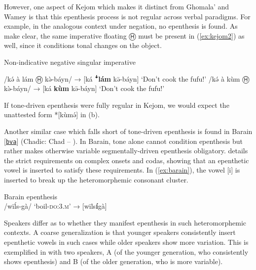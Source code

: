 \documentclass[output=paper,colorlinks,citecolor=brown,draft,draftmode]{langscibook}
\begin{document}
However, one aspect of Kejom which makes it distinct from Ghomala' and Wamey is that this epenthesis process is not regular across verbal paradigms.
For example, in the analogous context under negation, no epenthesis is found.
As \citet{akumbu_segmental_2020} make clear, the same imperative floating  Ⓗ 
must be present in (\ref{ex:kejom2}) as well,
since it conditions tonal changes on the object.

\begin{exe}
	\ex Non-indicative negative singular imperative  \citep[14]{akumbu_segmental_2020} \label{ex:kejom2}
	    \begin{xlist}
	        \ex 	/kə́ à lám Ⓗ kə̀-báyn/	→	[ká \textbf{ꜜlám} kə̄-báyn]		‘Don’t cook the fufu!’
	        \ex /kə́ à kùm Ⓗ kə̀-báyn/	→	[ká \textbf{kùm} kə̄-báyn]			‘Don’t cook the fufu!’
 	    \end{xlist}
\end{exe}
 
\noindent 
If tone-driven epenthesis were fully regular in Kejom, we would expect the unattested form *[kùmə́] 
in (b).

Another similar case which falls short of tone-driven epenthesis is found in Barain [\href{https://glottolog.org/resource/languoid/id/bare1279}{\texttt{bva}}] 
(Chadic: Chad -- \citealt{lovestrand_linguistic_2012}).
In Barain, tone alone cannot condition epenthesis but rather  makes otherwise variable segmentally-driven epenthesis obligatory.
\citet[21]{lovestrand_linguistic_2012} details the strict requirements on complex onsets and codas, showing that an epenthetic vowel is inserted to satisfy these requirements. 
In (\ref{ex:barain}), the vowel [i] is inserted to break up the heteromorphemic consonant cluster.

\begin{exe}
	\ex  Barain epenthesis \label{ex:barain} \citep[44]{lovestrand_linguistic_2012}\\
	/wīĺs-gà/ ‘boil-\textsc{do:3.m}’	 →
	[wīls\textbf{í}g{à}]
\end{exe}


Speakers differ as to whether they manifest epenthesis in such heteromorphemic contexts.
A coarse generalization is that younger speakers consistently insert epenthetic vowels in such cases while older speakers show more variation.
This is exemplified in  with two speakers, A (of the younger generation, who consistently shows epenthesis) and B (of the older generation, who is more variable).
\end{document}
